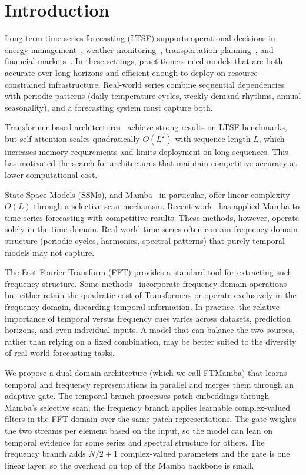 \documentclass[electronics,article,submit,pdftex,moreauthors]{Definitions/mdpi}
\begin{document}
\section{Introduction}

Long-term time series forecasting (LTSF) supports operational decisions in energy management~\cite{ref2}, weather monitoring~\cite{ref1}, transportation planning~\cite{ref3}, and financial markets~\cite{ref4}. In these settings, practitioners need models that are both accurate over long horizons and efficient enough to deploy on resource-constrained infrastructure. Real-world series combine sequential dependencies with periodic patterns (daily temperature cycles, weekly demand rhythms, annual seasonality), and a forecasting system must capture both.

Transformer-based architectures~\cite{ref5,ref6,ref7,ref8,ref9} achieve strong results on LTSF benchmarks, but self-attention scales quadratically $O(L^2)$ with sequence length $L$, which increases memory requirements and limits deployment on long sequences. This has motivated the search for architectures that maintain competitive accuracy at lower computational cost.

State Space Models (SSMs), and Mamba~\cite{ref10} in particular, offer linear complexity $O(L)$ through a selective scan mechanism. Recent work~\cite{ref11,ref12} has applied Mamba to time series forecasting with competitive results. These methods, however, operate solely in the time domain. Real-world time series often contain frequency-domain structure (periodic cycles, harmonics, spectral patterns) that purely temporal models may not capture.

The Fast Fourier Transform (FFT) provides a standard tool for extracting such frequency structure. Some methods~\cite{ref7,ref16} incorporate frequency-domain operations but either retain the quadratic cost of Transformers or operate exclusively in the frequency domain, discarding temporal information. In practice, the relative importance of temporal versus frequency cues varies across datasets, prediction horizons, and even individual inputs. A model that can balance the two sources, rather than relying on a fixed combination, may be better suited to the diversity of real-world forecasting tasks.

We propose a dual-domain architecture (which we call FTMamba) that learns temporal and frequency representations in parallel and merges them through an adaptive gate. The temporal branch processes patch embeddings through Mamba's selective scan; the frequency branch applies learnable complex-valued filters in the FFT domain over the same patch representations. The gate weights the two streams per element based on the input, so the model can lean on temporal evidence for some series and spectral structure for others. The frequency branch adds $N/2+1$ complex-valued parameters and the gate is one linear layer, so the overhead on top of the Mamba backbone is small.
\end{document}
